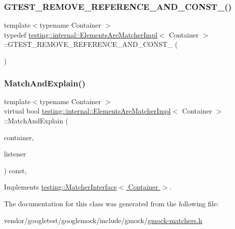 \subsubsection{\texorpdfstring{G\+T\+E\+S\+T\+\_\+\+R\+E\+M\+O\+V\+E\+\_\+\+R\+E\+F\+E\+R\+E\+N\+C\+E\+\_\+\+A\+N\+D\+\_\+\+C\+O\+N\+S\+T\+\_\+()}{GTEST\_REMOVE\_REFERENCE\_AND\_CONST\_()}}
{\footnotesize\ttfamily template$<$typename Container $>$ \\
typedef \hyperlink{classtesting_1_1internal_1_1_elements_are_matcher_impl}{testing\+::internal\+::\+Elements\+Are\+Matcher\+Impl}$<$ Container $>$\+::G\+T\+E\+S\+T\+\_\+\+R\+E\+M\+O\+V\+E\+\_\+\+R\+E\+F\+E\+R\+E\+N\+C\+E\+\_\+\+A\+N\+D\+\_\+\+C\+O\+N\+S\+T\+\_\+ (\begin{DoxyParamCaption}\item[{Container}]{ }\end{DoxyParamCaption})}

\mbox{\label{classtesting_1_1internal_1_1_elements_are_matcher_impl_a6562159fa83e09417c3552fd881f878e}} 
\subsubsection{\texorpdfstring{Match\+And\+Explain()}{MatchAndExplain()}}
{\footnotesize\ttfamily template$<$typename Container $>$ \\
virtual bool \hyperlink{classtesting_1_1internal_1_1_elements_are_matcher_impl}{testing\+::internal\+::\+Elements\+Are\+Matcher\+Impl}$<$ Container $>$\+::Match\+And\+Explain (\begin{DoxyParamCaption}\item[{Container}]{container,  }\item[{\hyperlink{classtesting_1_1_match_result_listener}{Match\+Result\+Listener} $\ast$}]{listener }\end{DoxyParamCaption}) const\hspace{0.3cm}{\ttfamily [inline]}, {\ttfamily [virtual]}}



Implements \hyperlink{classtesting_1_1_matcher_interface_a296b43607cd99d60365f0e6a762777cf}{testing\+::\+Matcher\+Interface$<$ Container $>$}.



The documentation for this class was generated from the following file\+:\begin{DoxyCompactItemize}
\item 
vendor/googletest/googlemock/include/gmock/\hyperlink{gmock-matchers_8h}{gmock-\/matchers.\+h}\end{DoxyCompactItemize}
